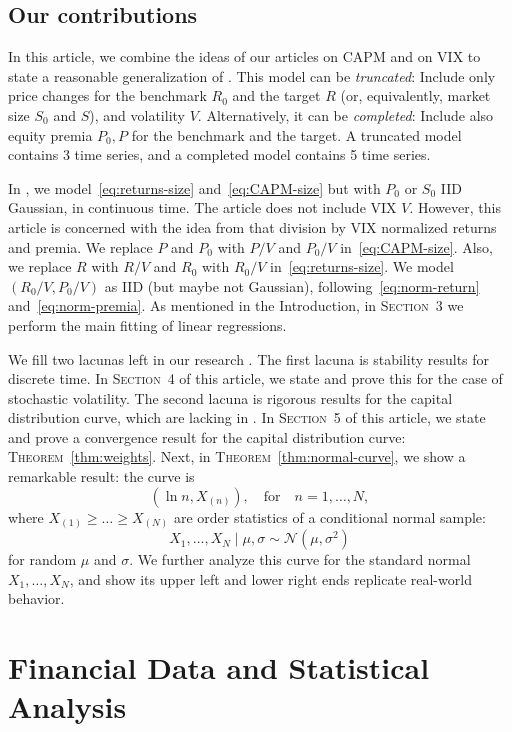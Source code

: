 \documentclass[12pt]{amsart}
\begin{document}
\subsection{Our contributions} In this article, we combine the ideas of our articles \cite{CAPM-size} on CAPM and \cite{VIX} on VIX to state a reasonable generalization of \cite{CAPM-size}. This model can be {\it truncated}: Include only price changes for the benchmark $R_0$ and the target $R$ (or, equivalently, market size $S_0$ and $S$), and volatility $V$. Alternatively, it can be {\it completed}: Include also equity premia $P_0, P$ for the benchmark and the target. A truncated model contains 3 time series, and a completed model contains 5 time series. 

In \cite{CAPM-size}, we model~\eqref{eq:returns-size} and~\eqref{eq:CAPM-size} but with $P_0$ or $S_0$ IID Gaussian, in continuous time. The article \cite{CAPM-size} does not include VIX $V$. However, this article is concerned with the idea from \cite{VIX} that division by VIX normalized returns and premia. We replace $P$ and $P_0$ with $P/V$ and $P_0/V$ in~\eqref{eq:CAPM-size}. Also, we replace $R$ with $R/V$ and $R_0$ with $R_0/V$ in~\eqref{eq:returns-size}. We model $(R_0/V, P_0/V)$ as IID (but maybe not Gaussian), following~\eqref{eq:norm-return} and~\eqref{eq:norm-premia}. As mentioned in the Introduction, in \textsc{Section}~3 we perform the main fitting of linear regressions. 

We fill two lacunas left in our research \cite{CAPM-size}. The first lacuna is stability results for discrete time. In \textsc{Section}~4 of this article, we state and prove this for the case of stochastic volatility. The second lacuna is rigorous results for the capital distribution curve, which are lacking in \cite{CAPM-size}. In \textsc{Section}~5 of this article, we state and prove a convergence result for the capital distribution curve: \textsc{Theorem}~\ref{thm:weights}. Next, in \textsc{Theorem}~\ref{thm:normal-curve}, we show a remarkable result: the curve is 
$$
(\ln n, X_{(n)}),\quad \mbox{for}\quad n = 1, \ldots, N,
$$
where $X_{(1)} \ge \ldots \ge X_{(N)}$ are order statistics of a conditional normal sample: 
$$
X_1, \ldots, X_N \mid \mu, \sigma \sim \mathcal N(\mu, \sigma^2)
$$
for random $\mu$ and $\sigma$. We further analyze this curve for the standard normal $X_1, \ldots, X_N$, and show its upper left and lower right ends replicate real-world behavior. 

\section{Financial Data and Statistical Analysis}
\end{document}
